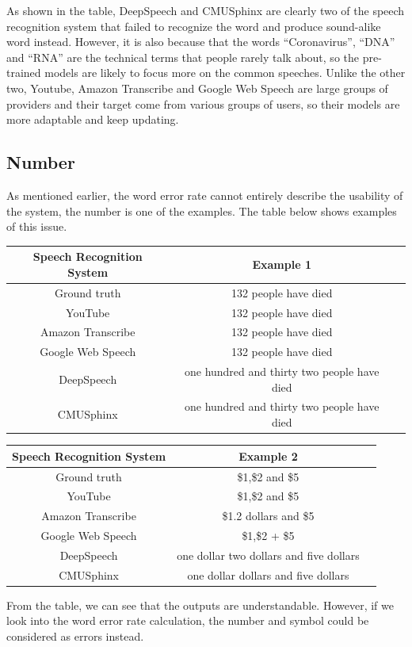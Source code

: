 \documentclass[natbib]{muthesis}
\begin{document}
 As shown in the table, DeepSpeech and CMUSphinx are clearly two of the speech recognition system that failed to recognize the word and produce sound-alike word instead. However, it is also because that the words ``Coronavirus'', ``DNA'' and ``RNA'' are the technical terms that people rarely talk about, so the pre-trained models are likely to focus more on the common speeches. Unlike the other two, Youtube, Amazon Transcribe and Google Web Speech are large groups of providers and their target come from various groups of users, so their models are more adaptable and keep updating.
 
 \subsection{Number}
 As mentioned earlier, the word error rate cannot entirely describe the usability of the system, the number is one of the examples. The table below shows examples of this issue.
 \begin{center}
 	\begin{tabular}{ |c|c|c| } 
 		\hline
 		Speech Recognition System & Example 1 \\ 
 		\hline
 		Ground truth & 132 people have died \\
 		YouTube & 132 people have died \\ 
 		Amazon Transcribe & 132 people have died \\
 		Google Web Speech & 132 people have died \\
 		DeepSpeech & one hundred and thirty two people have died \\
 		CMUSphinx & one hundred and thirty two people have died \\
 		\hline
 	\end{tabular}
 \end{center}
 \begin{center}
 	\begin{tabular}{ |c|c|c| } 
 		\hline
 		Speech Recognition System & Example 2 \\ 
 		\hline
 		Ground truth & \$1,\$2 and \$5\\
 		YouTube & \$1,\$2 and \$5\\ 
 		Amazon Transcribe & \$1.2 dollars and \$5\\
 		Google Web Speech & \$1,\$2 + \$5\\
 		DeepSpeech & one dollar two dollars and five dollars\\
 		CMUSphinx & one dollar dollars and five dollars\\
 		\hline
 	\end{tabular}
 \end{center}
 From the table, we can see that the outputs are understandable. However, if we look into the word error rate calculation, the number and symbol could be considered as errors instead.
 
\end{document}
